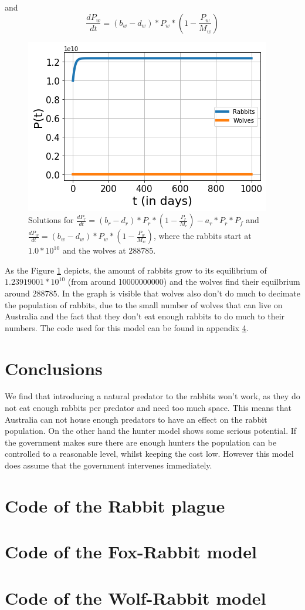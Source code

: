 \documentclass{article}
\begin{document}
and 
$$\frac{dP_w}{dt}=(b_w-d_w)*P_w*(1-\frac{P_w}{M_w})$$
\begin{figure}[h!]
    \centering
    \includegraphics[scale=0.78]{Pictures/RabbitWolves.png}
    \caption{Solutions for $\frac{dP_r}{dt}=(b_r-d_r)*P_r*(1-\frac{P_r}{M_r})-a_r*P_r*P_f$ and $\frac{dP_w}{dt}=(b_w-d_w)*P_w*(1-\frac{P_w}{M_w})$, where the rabbits start at $1.0*10^{10}$ and the wolves at $288785$.}
    \label{fig:RabbitsWolves}
\end{figure}
As the Figure \ref{fig:RabbitsWolves} depicts, the amount of rabbits grow to its equilibrium of $1.23919001*10^{10}$ (from around 10000000000) and the wolves find their equilbrium around $288785$. In the graph is visible that wolves also don't do much to decimate the population of rabbits, due to the small number of wolves that can live on Australia and the fact that they don't eat enough rabbits to do much to their numbers. The code used for this model can be found in appendix \ref{WolfRabbitModel}.
\section{Conclusions}
We find that introducing a natural predator to the rabbits won't work, as they do not eat enough rabbits per predator and need too much space. This means that Australia can not house enough predators to have an effect on the rabbit population. On the other hand the hunter model shows some serious potential. If the government makes sure there are enough hunters the population can be controlled to a reasonable level, whilst keeping the cost low. However this model does assume that the government intervenes immediately.


\appendix
\section{Code of the Rabbit plague}\label{Hunter_model}

\section{Code of the Fox-Rabbit model}\label{FoxRabbitModel}

\section{Code of the Wolf-Rabbit model}\label{WolfRabbitModel}

\end{document}
